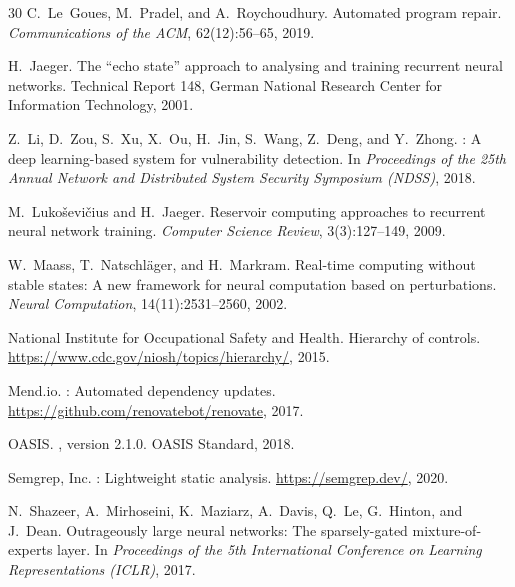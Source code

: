 \documentclass[11pt,a4paper]{article}
\begin{document}
\begin{thebibliography}{30}
C.~{Le~Goues}, M.~Pradel, and A.~Roychoudhury.
\newblock Automated program repair.
\newblock \emph{Communications of the ACM}, 62(12):56--65, 2019.

H.~Jaeger.
\newblock The ``echo state'' approach to analysing and training recurrent neural networks.
\newblock Technical Report 148, German National Research Center for Information Technology, 2001.

Z.~Li, D.~Zou, S.~Xu, X.~Ou, H.~Jin, S.~Wang, Z.~Deng, and Y.~Zhong.
: A deep learning-based system for vulnerability detection.
\newblock In \emph{Proceedings of the 25th Annual Network and Distributed System Security Symposium (NDSS)}, 2018.

M.~Luko\v{s}evi\v{c}ius and H.~Jaeger.
\newblock Reservoir computing approaches to recurrent neural network training.
\newblock \emph{Computer Science Review}, 3(3):127--149, 2009.

W.~Maass, T.~Natschl{\"a}ger, and H.~Markram.
\newblock Real-time computing without stable states: A new framework for neural computation based on perturbations.
\newblock \emph{Neural Computation}, 14(11):2531--2560, 2002.

{National Institute for Occupational Safety and Health}.
\newblock Hierarchy of controls.
\newblock \url{https://www.cdc.gov/niosh/topics/hierarchy/}, 2015.

{Mend.io}.
: Automated dependency updates.
\newblock \url{https://github.com/renovatebot/renovate}, 2017.

{OASIS}.
, version 2.1.0.
\newblock OASIS Standard, 2018.

{Semgrep, Inc.}
: Lightweight static analysis.
\newblock \url{https://semgrep.dev/}, 2020.

N.~Shazeer, A.~Mirhoseini, K.~Maziarz, A.~Davis, Q.~Le, G.~Hinton, and J.~Dean.
\newblock Outrageously large neural networks: The sparsely-gated mixture-of-experts layer.
\newblock In \emph{Proceedings of the 5th International Conference on Learning Representations (ICLR)}, 2017.


\end{thebibliography}
\end{document}
